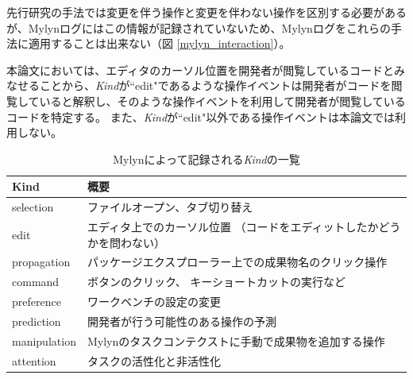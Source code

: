 \documentclass[a4paper]{jsbook}
\begin{document}
先行研究\cite{6233415,KatoJapanese:2011,ss2012-76,ss2013-84,Yamamori:2016}の手法では変更を伴う操作と変更を伴わない操作を区別する必要があるが、Mylynログにはこの情報が記録されていないため、Mylynログをこれらの手法に適用することは出来ない（図 \ref{mylyn_interaction}）。

本論文においては、エディタのカーソル位置を開発者が閲覧しているコードとみなせることから、{\it Kind}が``edit"であるような操作イベントは開発者がコードを閲覧していると解釈し、そのような操作イベントを利用して開発者が閲覧しているコードを特定する。
また、{\it Kind}が``edit"以外である操作イベントは本論文では利用しない。

\begin{table}[tb]
  \centering
  \caption{Mylynによって記録される{\it Kind}の一覧}
  \label{kind_table}
\begin{tabular}{ll}
  \hline
  Kind & 概要\\
  \hline
  selection & ファイルオープン、タブ切り替え\\
  edit & エディタ上でのカーソル位置 （コードをエディットしたかどうかを問わない）\\
  propagation & パッケージエクスプローラー上での成果物名のクリック操作\\
  command & ボタンのクリック、 キーショートカットの実行など\\
  preference & ワークベンチの設定の変更\\
  prediction & 開発者が行う可能性のある操作の予測\cite{Kersten:2006}\\
  manipulation & Mylynのタスクコンテクストに手動で成果物を追加する操作\\
  attention & タスクの活性化と非活性化\\
  \hline
\end{tabular}
\end{table}
\end{document}
